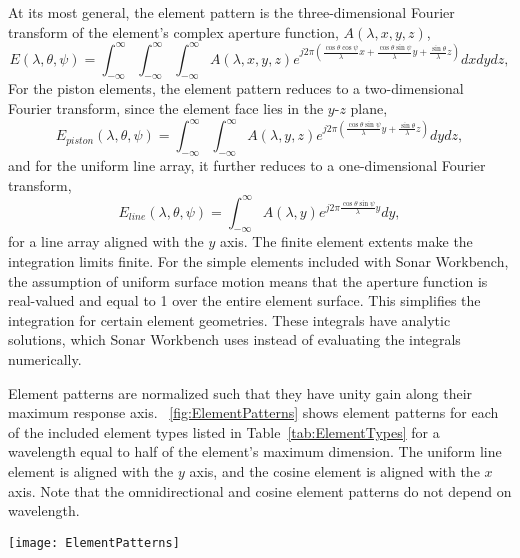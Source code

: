 At its most general, the element pattern is the three-dimensional Fourier transform of the element's complex aperture function, $A(\lambda,x,y,z)$,
\begin{equation}
E(\lambda,\theta,\psi) = \int_{-\infty}^\infty\int_{-\infty}^\infty\int_{-\infty}^\infty A(\lambda,x,y,z)e^{j2\pi\left(\frac{\cos\theta\cos\psi}{\lambda}x + \frac{\cos\theta\sin\psi}{\lambda}y + \frac{\sin\theta}{\lambda}z\right)}dxdydz,\label{eq:VolumetricFT}
\end{equation}
For the piston elements, the element pattern reduces to a two-dimensional Fourier transform, since the element face lies in the $y$-$z$ plane,
\begin{equation}
E_{piston}(\lambda,\theta,\psi) = \int_{-\infty}^\infty\int_{-\infty}^\infty A(\lambda,y,z)e^{j2\pi\left(\frac{\cos\theta\sin\psi}{\lambda}y + \frac{\sin\theta}{\lambda}z\right)}dydz,\label{eq:PlanarFT}
\end{equation}
and for the uniform line array, it further reduces to a one-dimensional Fourier transform,
\begin{equation}
E_{line}(\lambda,\theta,\psi) = \int_{-\infty}^\infty A(\lambda,y)e^{j2\pi\frac{\cos\theta\sin\psi}{\lambda}y}dy,\label{eq:LinearFT}
\end{equation}
for a line array aligned with the $y$ axis. The finite element extents make the integration limits finite. For the simple elements included with Sonar Workbench, the assumption of uniform surface motion means that the aperture function is real-valued and equal to 1 over the entire element surface. This simplifies the integration for certain element geometries. These integrals have analytic solutions, which Sonar Workbench uses instead of evaluating the integrals numerically.

Element patterns are normalized such that they have unity gain along their maximum response axis. \figurename~\ref{fig:ElementPatterns} shows element patterns for each of the included element types listed in Table~\ref{tab:ElementTypes} for a wavelength equal to half of the element's maximum dimension. The uniform line element is aligned with the $y$ axis, and the cosine element is aligned with the $x$ axis. Note that the omnidirectional and cosine element patterns do not depend on wavelength.

\begin{sidewaysfigure}[!ht]
\begin{center}
\texttt{[image: ElementPatterns]}
\caption{\label{fig:ElementPatterns}Element patterns for included element types (magnitude in dB)}
\end{center}
\end{sidewaysfigure}
